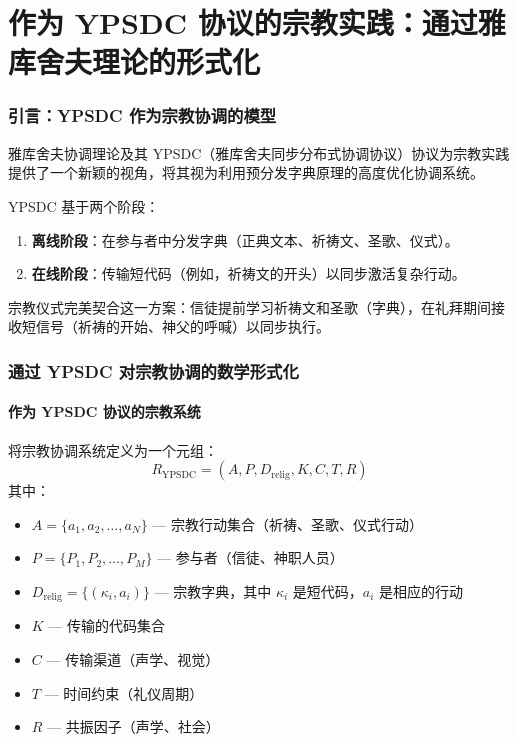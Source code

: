\documentclass[12pt,a4paper]{article}
\begin{document}
	\tableofcontents
	
	\newpage
	
	\part{作为 YPSDC 协议的宗教实践：通过雅库舍夫理论的形式化}
	
	\section{引言：YPSDC 作为宗教协调的模型}
	
	雅库舍夫协调理论及其 YPSDC（雅库舍夫同步分布式协调协议）协议为宗教实践提供了一个新颖的视角，将其视为利用预分发字典原理的高度优化协调系统。
	
	YPSDC 基于两个阶段：
	\begin{enumerate}
		\item \textbf{离线阶段}：在参与者中分发字典（正典文本、祈祷文、圣歌、仪式）。
		\item \textbf{在线阶段}：传输短代码（例如，祈祷文的开头）以同步激活复杂行动。
	\end{enumerate}
	
	宗教仪式完美契合这一方案：信徒提前学习祈祷文和圣歌（字典），在礼拜期间接收短信号（祈祷的开始、神父的呼喊）以同步执行。
	
	\section{通过 YPSDC 对宗教协调的数学形式化}
	
	\subsection{作为 YPSDC 协议的宗教系统}
	
	将宗教协调系统定义为一个元组：
	\[
	R_{\mathrm{YPSDC}} = (A, P, D_{\mathrm{relig}}, K, C, T, R)
	\]
	其中：
	\begin{itemize}
		\item $A = \{a_1, a_2, \ldots, a_N\}$ — 宗教行动集合（祈祷、圣歌、仪式行动）
		\item $P = \{P_1, P_2, \ldots, P_M\}$ — 参与者（信徒、神职人员）
		\item $D_{\mathrm{relig}} = \{(\kappa_i, a_i)\}$ — 宗教字典，其中 $\kappa_i$ 是短代码，$a_i$ 是相应的行动
		\item $K$ — 传输的代码集合
		\item $C$ — 传输渠道（声学、视觉）
		\item $T$ — 时间约束（礼仪周期）
		\item $R$ — 共振因子（声学、社会）
	\end{itemize}
	
\end{document}
